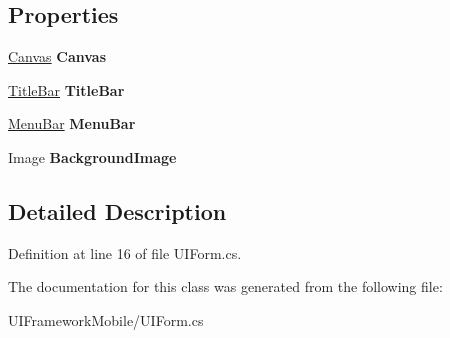 \subsection*{Properties}
\begin{DoxyCompactItemize}
\item 
\hypertarget{class_msdn_1_1_u_i_framework_1_1_u_i_form_a135684b1c6b62b6a5eb4e79f5de97f27}{
\hyperlink{class_msdn_1_1_u_i_framework_1_1_canvas}{Canvas} {\bfseries Canvas}}
\label{class_msdn_1_1_u_i_framework_1_1_u_i_form_a135684b1c6b62b6a5eb4e79f5de97f27}

\item 
\hypertarget{class_msdn_1_1_u_i_framework_1_1_u_i_form_a639265a0a28da65ec32403228bfd8d5c}{
\hyperlink{class_msdn_1_1_u_i_framework_1_1_title_bar}{TitleBar} {\bfseries TitleBar}}
\label{class_msdn_1_1_u_i_framework_1_1_u_i_form_a639265a0a28da65ec32403228bfd8d5c}

\item 
\hypertarget{class_msdn_1_1_u_i_framework_1_1_u_i_form_a0db379f4fb292bda86c16d1deeb6de18}{
\hyperlink{class_msdn_1_1_u_i_framework_1_1_menu_bar}{MenuBar} {\bfseries MenuBar}}
\label{class_msdn_1_1_u_i_framework_1_1_u_i_form_a0db379f4fb292bda86c16d1deeb6de18}

\item 
\hypertarget{class_msdn_1_1_u_i_framework_1_1_u_i_form_a23d608c572bd7186832528762abe543b}{
Image {\bfseries BackgroundImage}}
\label{class_msdn_1_1_u_i_framework_1_1_u_i_form_a23d608c572bd7186832528762abe543b}

\end{DoxyCompactItemize}


\subsection{Detailed Description}


Definition at line 16 of file UIForm.cs.

The documentation for this class was generated from the following file:\begin{DoxyCompactItemize}
\item 
UIFrameworkMobile/UIForm.cs\end{DoxyCompactItemize}
